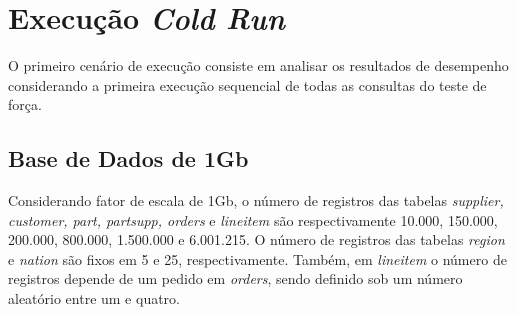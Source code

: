 
\section{Execução \textit{Cold Run}}

O primeiro cenário de execução consiste em analisar os resultados de desempenho considerando a primeira execução sequencial de todas as consultas do teste de força. 

\subsection{Base de Dados de 1Gb}

Considerando fator de escala de 1Gb, o número de registros das tabelas \textit{supplier, customer, part, partsupp, orders} e \textit{lineitem} são respectivamente 10.000, 150.000, 200.000, 800.000, 1.500.000 e 6.001.215. O número de registros das tabelas \textit{region} e \textit{nation} são fixos em 5 e 25, respectivamente. Também, em \textit{lineitem} o número de registros depende de um pedido em \textit{orders}, sendo definido sob um número aleatório entre um e quatro.

